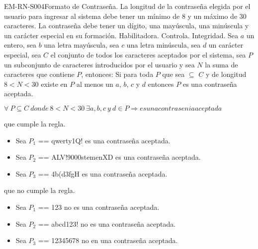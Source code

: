 \begin{BussinesRule}{EM-RN-S004}{Formato de Contraseña.} 
	\BRitem[Descripción:] La longitud de la contraseña elegida  por el usuario para ingresar al sistema 
	debe tener un mínimo de 8 y un máximo de 30 caracteres. 
	La contraseña debe tener un dígito, una mayúscula, una minúscula y un carácter especial en su
	formación.
	\BRitem[Tipo:] Habilitadora.
	\BRitem[Nivel:] Controla.
	\BRitem[Clase:] Integridad.
	\BRitem[Sentencia : ] Sea $a$ un entero, sea $b$ una letra mayúscula, sea $c$ una letra minúscula,
	sea $d$ un carácter especial, sea $C$ el conjunto de todos los caracteres aceptados 
	por el sistema, sea $P$ un subconjunto de caracteres introducidos por el usuario y sea 
	$N$ la suma de  caracteres que contiene $P$, entonces: \newline
	Si para toda $P$ que sea $\subseteq$ $C$ y de longitud $8 < N < 30$ existe en $P$ al menos un $a$, $b$, 
	$c$ y $d$ entonces $P$ es una contraseña aceptada.
	\begin{center}
		$\forall \: P \subseteq C \: donde \: 8 < N < 30 \: \exists a, b, c \:y\: d \in P 
		\Rightarrow  es una contrasenia aceptada$
	\end{center}
	 que cumple la regla.
		\begin{itemize}
			\item Sea $P_{1}$ == qwerty1Q! es una contraseña aceptada. 
			\item Sea $P_{2}$ == ALV!9000stemenXD es una contraseña aceptada.
			\item Sea $P_{3}$ == 4b(d3fgH es una contraseña aceptada.
		\end{itemize}
	 que no cumple la regla.
		\begin{itemize}
			\item Sea $P_{1}$ == 123 no es una contraseña aceptada.
			\item Sea $P_{2}$ == abcd123! no es una contraseña aceptada.
			\item Sea $P_{3}$ == 12345678 no en una contraseña aceptada.
		\end{itemize}
\end{BussinesRule}


